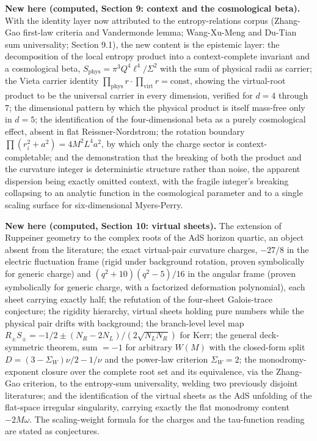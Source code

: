 \documentclass[11pt]{article}
\begin{document}
\textbf{New here (computed, Section 9: context and the cosmological beta).} With the identity layer now attributed to the entropy-relations corpus (Zhang-Gao first-law criteria and Vandermonde lemma; Wang-Xu-Meng and Du-Tian sum universality; Section 9.1), the new content is the epistemic layer: the decomposition of the local entropy product into a context-complete invariant and a cosmological beta, $S_{\text{phys}} = \pi^3 Q^4\ell^4/\Sigma^2$ with the sum of physical radii as carrier; the Vieta carrier identity $\prod_{\text{phys}} r \cdot \prod_{\text{virt}} r = \text{const}$, showing the virtual-root product to be the universal carrier in every dimension, verified for $d = 4$ through $7$; the dimensional pattern by which the physical product is itself mass-free only in $d=5$; the identification of the four-dimensional beta as a purely cosmological effect, absent in flat Reissner-Nordstrom; the rotation boundary $\prod(r_i^2+a^2) = 4M^2L^4a^2$, by which only the charge sector is context-completable; and the demonstration that the breaking of both the product and the curvature integer is deterministic structure rather than noise, the apparent dispersion being exactly omitted context, with the fragile integer's breaking collapsing to an analytic function in the cosmological parameter and to a single scaling surface for six-dimensional Myers-Perry.

\textbf{New here (computed, Section 10: virtual sheets).} The extension of Ruppeiner geometry to the complex roots of the AdS horizon quartic, an object absent from the literature; the exact virtual-pair curvature charges, $-27/8$ in the electric fluctuation frame (rigid under background rotation, proven symbolically for generic charge) and $(q^2+10)(q^2-5)/16$ in the angular frame (proven symbolically for generic charge, with a factorized deformation polynomial), each sheet carrying exactly half; the refutation of the four-sheet Galois-trace conjecture; the rigidity hierarchy, virtual sheets holding pure numbers while the physical pair drifts with background; the branch-level level map $R_\pm S_\pm = -1/2 \pm (N_R - 2N_L)/(2\sqrt{N_L N_R})$ for Kerr; the general deck-symmetric theorem, sum $= -1$ for arbitrary $W(M)$ with the closed-form split $D = (3-\Sigma_W)\nu/2 - 1/\nu$ and the power-law criterion $\Sigma_W = 2$; the monodromy-exponent closure over the complete root set and its equivalence, via the Zhang-Gao criterion, to the entropy-sum universality, welding two previously disjoint literatures; and the identification of the virtual sheets as the AdS unfolding of the flat-space irregular singularity, carrying exactly the flat monodromy content $-2M\omega$. The scaling-weight formula for the charges and the tau-function reading are stated as conjectures.
\end{document}
